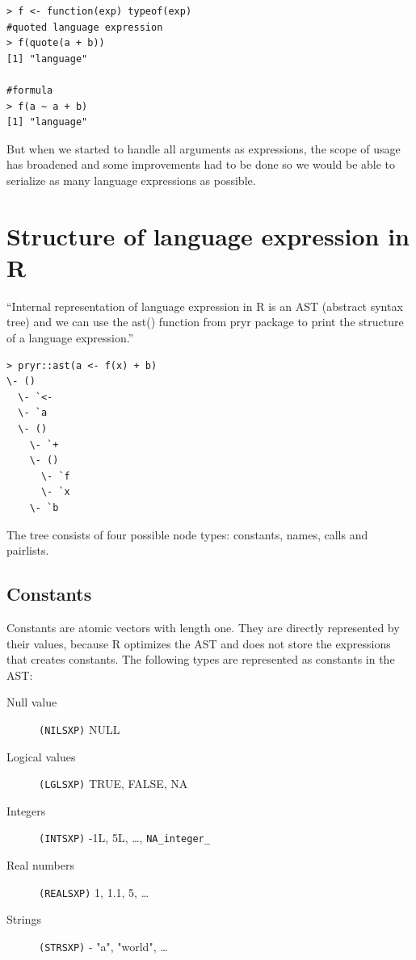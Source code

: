 \documentclass[thesis=B,english]{FITthesis}[2012/10/20]
\begin{document}
\begin{verbatim}
> f <- function(exp) typeof(exp)
#quoted language expression
> f(quote(a + b))
[1] "language"

#formula
> f(a ~ a + b)
[1] "language"
\end{verbatim}

But when we started to handle all arguments as expressions, the scope of usage has broadened and some improvements had to be done so we would be able to serialize as many language expressions as possible.

\section{Structure of language expression in R} \label{sec:ast}
``Internal representation of language expression in R is an AST (abstract syntax tree) and we can use the ast() function from pryr package to print the structure of a language expression.'' \cite{advR}

\begin{minipage}{\linewidth}
\begin{verbatim}
> pryr::ast(a <- f(x) + b)
\- ()
  \- `<-
  \- `a
  \- ()
    \- `+
    \- ()
      \- `f
      \- `x
    \- `b
\end{verbatim}
\end{minipage}

The tree consists of four possible node types: constants, names, calls and pairlists.

\subsection{Constants}
Constants are atomic vectors with length one. They are directly represented by their values, because R optimizes the AST and does not store the expressions that creates constants. The following types are represented as constants in the AST:

\begin{description}
	\item[Null value] \verb|(NILSXP)| NULL
	\item[Logical values] \verb|(LGLSXP)| TRUE, FALSE, NA
	\item[Integers] \verb|(INTSXP)| -1L, 5L, \ldots, \verb|NA_integer_|
	\item[Real numbers] \verb|(REALSXP)| 1, 1.1, 5, \ldots
	\item[Strings] \verb|(STRSXP)| - "a", "world", \ldots

\end{description}
\end{document}
